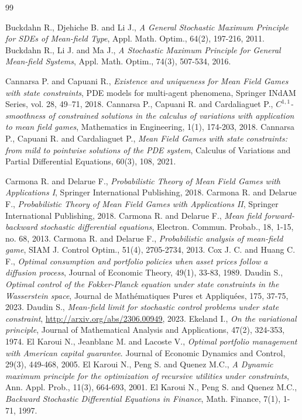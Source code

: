 \documentclass[11pt,a4paper]{article}
\begin{document}
\begin{thebibliography}{99}
 

  Buckdahn R., Djehiche B. and Li J.,
  \textit{A General Stochastic Maximum Principle for SDEs of Mean-field Type}, Appl. Math. Optim., 64(2), 197-216, 2011.
  Buckdahn R.,  Li J. and Ma J.,
  \textit{A Stochastic Maximum Principle for General  Mean-field Systems}, Appl. Math. Optim., 74(3), 507-534, 2016. 


Cannarsa P. and Capuani R., 
   \textit{Existence and uniqueness for Mean Field Games with state constraints},
   PDE models for multi-agent phenomena, Springer INdAM Series, vol. 28, 49--71, 2018.
Cannarsa P., Capuani R. and Cardaliaguet P.,
   \textit{$C^{1,1}$- smoothness of constrained solutions in the calculus of variations with application to mean field games}, Mathematics in Engineering, 1(1), 174-203, 2018.
Cannarsa P., Capuani R. and Cardaliaguet P.,
  \textit{Mean Field Games with state constraints: from mild to pointwise solutions of the PDE system}, Calculus of Variations and Partial Differential Equations, 60(3), 108, 2021.

  Carmona R. and Delarue F.,
  \textit{Probabilistic Theory of Mean Field Games with Applications I}, Springer International Publishing, 2018.
  Carmona R. and Delarue F.,
  \textit{Probabilistic Theory of Mean Field Games with Applications II}, Springer International Publishing, 2018.
Carmona R. and Delarue F.,
\textit{Mean field forward-backward stochastic differential equations}, Electron. Commun. Probab., 18, 1-15,  no. 68, 2013.
Carmona R. and Delarue F., \textit{Probabilistic analysis of mean-field game}, SIAM J. Control Optim., 51(4), 2705-2734, 2013.
 Cox J. C. and Huang C. F., \textit{Optimal consumption and portfolio policies when asset prices follow a diffusion process}, Journal of Economic Theory, 49(1), 33-83, 1989.
  Daudin S.,
 \textit{Optimal control of the Fokker-Planck equation under state constraints in the Wasserstein space}, Journal de Math\'ematiques Pures et Appliqu\'ees,  175, 37-75, 2023. 
  Daudin S.,
 \textit{Mean-field limit for stochastic control problems under state constraint}, \url{http://arxiv.org/abs/2306.00949}, 2023.
  Ekeland I.,
 \textit{On the variational principle}, Journal of Mathematical Analysis and Applications,  47(2), 324-353, 1974. 
El Karoui N., Jeanblanc M. and Lacoste V., \textit{Optimal portfolio management with American capital guarantee}. Journal of Economic Dynamics and Control, 29(3), 449-468, 2005.
  El Karoui N., Peng S. and Quenez M.C.,
 \textit{A Dynamic maximum principle for the optimization of recursive utilities under constraints}, Ann. Appl. Prob., 11(3), 664-693, 2001.
  El Karoui N., Peng S. and Quenez M.C.,
 \textit{Backward Stochastic Differential Equations in Finance}, Math. Finance, 7(1), 1-71, 1997.


\end{thebibliography}
\end{document}
